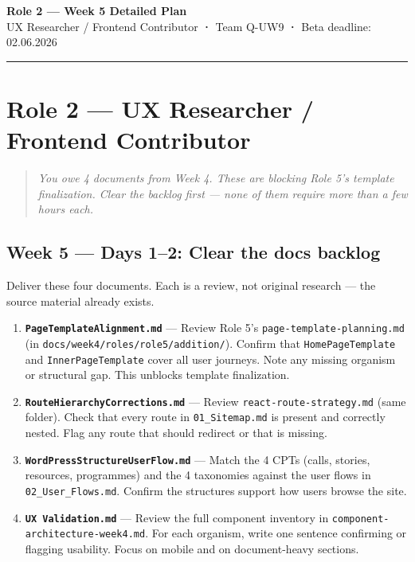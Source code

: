 \documentclass[11pt,a4paper]{article}
\begin{document}
\begin{center}
    {\Large\bfseries\color{uvtBlue} Role 2 — Week 5 Detailed Plan}\\[0.4em]
    {\small UX Researcher / Frontend Contributor \textbf{·} Team Q-UW9 \textbf{·} Beta deadline: 02.06.2026}
\end{center}
\vspace{0.3em}
\textcolor{uvtYellow}{\rule{\linewidth}{2pt}}
\vspace{0.8em}
\section{Role 2 — UX Researcher / Frontend Contributor}

\begin{quote}\itshape
You owe 4 documents from Week 4. These are blocking Role 5's template finalization. Clear the backlog first — none of them require more than a few hours each.
\end{quote}

\subsection{Week 5 — Days 1–2: Clear the docs backlog}

Deliver these four documents. Each is a review, not original research — the source material already exists.

\begin{enumerate}
\item \textbf{\nolinkurl{PageTemplateAlignment.md}} — Review Role 5's \nolinkurl{page-template-planning.md} (in \nolinkurl{docs/week4/roles/role5/addition/}). Confirm that \nolinkurl{HomePageTemplate} and \nolinkurl{InnerPageTemplate} cover all user journeys. Note any missing organism or structural gap. This unblocks template finalization.
\item \textbf{\nolinkurl{RouteHierarchyCorrections.md}} — Review \nolinkurl{react-route-strategy.md} (same folder). Check that every route in \nolinkurl{01_Sitemap.md} is present and correctly nested. Flag any route that should redirect or that is missing.
\item \textbf{\nolinkurl{WordPressStructureUserFlow.md}} — Match the 4 CPTs (calls, stories, resources, programmes) and the 4 taxonomies against the user flows in \nolinkurl{02_User_Flows.md}. Confirm the structures support how users browse the site.
\item \textbf{\nolinkurl{UX Validation.md}} — Review the full component inventory in \nolinkurl{component-architecture-week4.md}. For each organism, write one sentence confirming or flagging usability. Focus on mobile and on document-heavy sections.
\end{enumerate}
\end{document}
